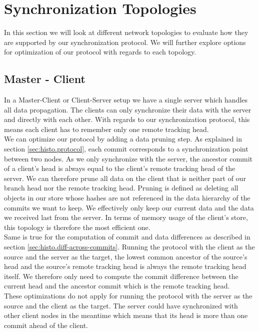 
\section{Synchronization Topologies}
\label{sec:histo.topologies}

In this section we will look at different network topologies to evaluate how they are supported by our synchronization protocol.
We will further explore options for optimization of our protocol with regards to each topology.\\

\subsection{Master - Client}
\label{sec:histo.topologies.master-client}
In a Master-Client or Client-Server setup we have a single server which handles all data propagation.
The clients can only synchronize their data with the server and directly with each other.
With regards to our synchronization protocol, this means each client has to remember only one remote tracking head.\\
We can optimize our protocol by adding a data pruning step.
As explained in section \ref{sec:histo.protocol}, each commit corresponds to a synchronization point between two nodes.
As we only synchronize with the server, the ancestor commit of a client's head is always equal to the client's remote tracking head of the server.
We can therefore prune all data on the client that is neither part of our branch head nor the remote tracking head.
Pruning is defined as deleting all objects in our store whose hashes are not referenced in the data hierarchy of the commits we want to keep.
We effectively only keep our current data and the data we received last from the server.
In terms of memory usage of the client's store, this topology is therefore the most efficient one.\\
Same is true for the computation of commit and data differences as described in section \ref{sec:histo.diff-across-commits}.
Running the protocol with the client as the source and the server as the target, the lowest common ancestor of the source's head and the source's remote tracking head is always the remote tracking head itself.
We therefore only need to compute the commit difference between the current head and the ancestor commit which is the remote tracking head.\\
These optimizations do not apply for running the protocol with the server as the source and the client as the target.
The server could have synchronized with other client nodes in the meantime which means that its head is more than one commit ahead of the client.

